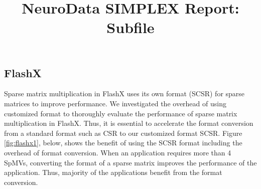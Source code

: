 \documentclass[simplex.tex]{subfiles}
\title{NeuroData SIMPLEX Report: Subfile}
\begin{document}


\subsection{FlashX}

Sparse matrix multiplication in FlashX uses its own format (SCSR) for
sparse matrices to improve performance. We investigated the overhead of
using customized format to thoroughly evaluate the performance of sparse
matrix multiplication in FlashX. Thus, it is essential to accelerate the
format conversion from a standard format such as CSR to our customized
format SCSR. Figure \ref{fig:flashx1}, below, shows the benefit of using
the SCSR format including the overhead of format conversion. When an
application requires more than 4 SpMVs, converting the format of a
sparse matrix improves the performance of the application. Thus,
majority of the applications benefit from the format conversion.
\end{document}
